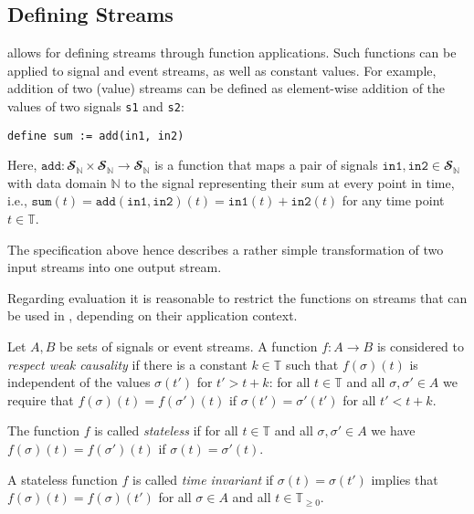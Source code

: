 \subsection{Defining Streams}

\tessla allows for defining streams through function applications.
Such functions can be applied to signal and event streams, as well as constant values.
For example, addition of two (value) streams can be defined as element-wise addition of the values of two signals \texttt{s1} and \texttt{s2}:
\begin{lstlisting}[language=tessla]
  define sum := add(in1, in2)
\end{lstlisting}
Here, $\mathtt{add}: 𝓢_ℕ × 𝓢_ℕ → 𝓢_ℕ$ is a function that maps a pair of signals $\mathtt{in1},\mathtt{in2}∈𝓢_ℕ$ with data domain $ℕ$ to the signal representing their sum at every point in time, i.e.,  $\mathtt{sum}(t) = \mathtt{add}(\mathtt{in1}, \mathtt{in2})(t) = \mathtt{in1}(t) + \mathtt{in2}(t)$ for any time point $t∈𝕋$.

The specification above hence describes a rather simple transformation of two input streams into one output stream.

Regarding evaluation it is reasonable to restrict the functions on streams that can be used in \tessla, depending on their application context.

\begin{definition}
Let $A,B$ be sets of signals or event streams.
A function $f: A → B$ is considered to \emph{respect weak causality} if there is a constant $k∈𝕋$ such that $f(σ)(t)$ is independent of the values $σ(t')$ for $t'>t+k$:
for all $t∈𝕋$ and all $σ,σ'∈A$ we require that $f(σ)(t) = f(σ')(t)$ if $σ(t')=σ'(t')$ for all $t'<t+k$.

The function $f$ is called \emph{stateless} if for all $t∈𝕋$ and all $σ,σ'∈A$ we have $f(σ)(t) = f(σ')(t)$ if $σ(t) = σ'(t)$.

A stateless function $f$ is called \emph{time invariant} if $σ(t) = σ(t')$ implies that $f(σ)(t) = f(σ)(t')$ for all $σ∈A$ and all $t∈𝕋_{≥0}$.
\end{definition}



